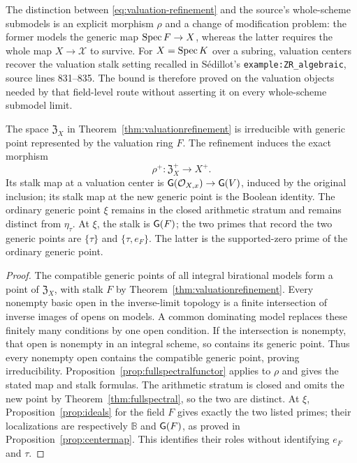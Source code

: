 The distinction between \eqref{eq:valuation-refinement} and the source's
whole-scheme submodels is an explicit morphism $\rho$ and a change of
modification problem: the former models the generic map $\operatorname{Spec} F\to X$,
whereas the latter requires the whole map $X\to\mathcal X$ to survive.
For $X=\operatorname{Spec} K$ over a subring, valuation centers recover the valuation
stalk setting recalled in S\'edillot's
\nolinkurl{example:ZR_algebraic}, source lines 831--835. The bound is
therefore proved on the valuation objects needed by that field-level
route without asserting it on every whole-scheme submodel limit.

\begin{corollary}
\label{cor:fullrefinement}
The space $\mathfrak Z_X$ in Theorem~\ref{thm:valuationrefinement} is
irreducible with generic point represented by the valuation ring $F$.
The refinement induces the exact morphism
\[
 \rho^+:\mathfrak Z_X^+\longrightarrow X^+.
 \tag{AV7.3a}\label{eq:fullrefinement}
\]
Its stalk map at a valuation center is
$\mathsf G(\mathcal O_{X,x})\to\mathsf G(V)$, induced by the original inclusion;
its stalk map at the new generic point is the Boolean identity.
The ordinary generic point $\xi$ remains in the closed arithmetic
stratum and remains distinct from $\eta_\tau$. At $\xi$, the stalk is
$\mathsf G(F)$; the two primes that record the two generic points are
$\{\tau\}$ and $\{\tau,e_F\}$. The latter is the supported-zero prime
of the ordinary generic point.
\end{corollary}
\begin{proof}
The compatible generic points of all integral birational models form
a point of $\mathfrak Z_X$, with stalk $F$ by
Theorem~\ref{thm:valuationrefinement}. Every nonempty basic open in the
inverse-limit topology is a finite intersection of inverse images of
opens on models. A common dominating model replaces these finitely
many conditions by one open condition. If the intersection is nonempty,
that open is nonempty in an integral scheme, so contains its generic
point. Thus every nonempty open contains the compatible generic point,
proving irreducibility. Proposition~\ref{prop:fullspectralfunctor}
applies to $\rho$ and gives the stated map and stalk formulas.
The arithmetic stratum is closed and omits the new point by
Theorem~\ref{thm:fullspectral}, so the two are distinct. At $\xi$,
Proposition~\ref{prop:ideals} for the field $F$ gives exactly the two
listed primes; their localizations are respectively $\mathbb B$ and
$\mathsf G(F)$, as proved in Proposition~\ref{prop:centermap}. This identifies
their roles without identifying $e_F$ and $\tau$.
\end{proof}

